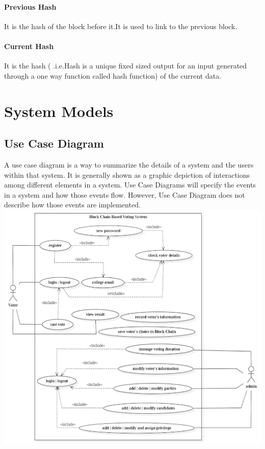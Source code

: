\documentclass[a4paper,12pt]{report}
\begin{document}
\paragraph{Previous Hash}
It is the hash of the block before it.It is used to link to the previous block.

\paragraph{Current Hash}
It is the hash ( .i.e.Hash is a unique fixed sized output for an input generated through a one way function called hash function) of the current data.

\section{System Models}
\subsection{Use Case Diagram}
A use case diagram is a way to summarize the details of a system and the users within that system. It is generally shown as a graphic depiction of interactions among different elements in a system. Use Case Diagrams will specify the events in a system and how those events flow. However, Use Case Diagram does not describe how those events are implemented.\\

\includegraphics[scale=0.5]{images/UseCaseDig.png} 
\end{document}
